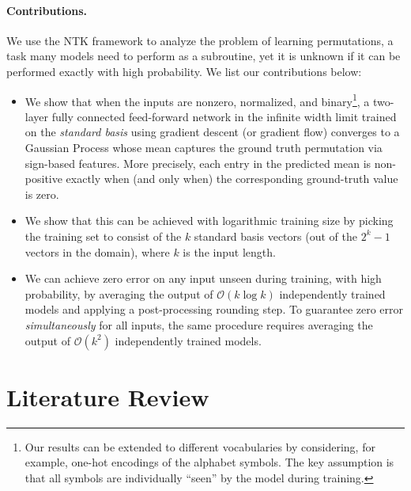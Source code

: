 \paragraph{Contributions.} We use the NTK framework to analyze the problem of learning permutations, a task many models need to perform as a subroutine, yet it is unknown if it can be performed exactly with high probability. We list our contributions below:
\begin{itemize}
    \item We show that when the inputs are nonzero, normalized, and binary\footnote{Our results can be extended to different vocabularies by considering, for example, one-hot encodings of the alphabet symbols. The key assumption is that all symbols are individually ``seen'' by the model during training.}, a two-layer fully connected feed-forward network in the infinite width limit trained on the \textit{standard basis} using gradient descent (or gradient flow) converges to a Gaussian Process whose mean captures the ground truth permutation via sign-based features. More precisely, each entry in the predicted mean is non-positive exactly when (and only when) the corresponding ground-truth value is zero.
    \item We show that this can be achieved with logarithmic training size by picking the training set to consist of the $k$ standard basis vectors (out of the $2^k-1$ vectors in the domain), where $k$ is the input length.
    \item We can achieve zero error on any input unseen during training, with high probability, by averaging the output of $\mathcal{O}(k\log k)$ independently trained models and applying a post-processing rounding step. To guarantee zero error \emph{simultaneously} for all inputs, the same procedure requires averaging the output of $\mathcal{O}(k^2)$ independently trained models.
\end{itemize}

\section{Literature Review}

